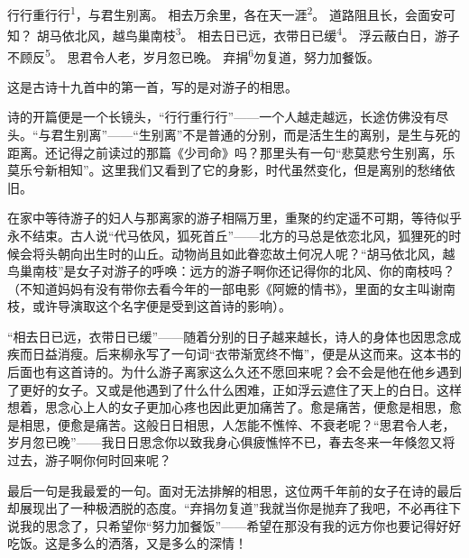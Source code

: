 
\begin{poem}
行行重行行\textsuperscript{1}，与君生别离。
相去万余里，各在天一涯\textsuperscript{2}。
道路阻且长，会面安可知？
胡马依北风，越鸟巢南枝\textsuperscript{3}。
相去日已远，衣带日已缓\textsuperscript{4}。
浮云蔽白日，游子不顾反\textsuperscript{5}。
思君令人老，岁月忽已晚。
弃捐\textsuperscript{6}勿复道，努力加餐饭。
\end{poem}

\begin{annotations}
\end{annotations}

\begin{appreciation}
这是古诗十九首中的第一首，写的是对游子的相思。

诗的开篇便是一个长镜头，“行行重行行”——一个人越走越远，长途仿佛没有尽头。“与君生别离”——“生别离”不是普通的分别，而是活生生的离别，是生与死的距离。还记得之前读过的那篇《少司命》吗？那里头有一句“悲莫悲兮生别离，乐莫乐兮新相知”。这里我们又看到了它的身影，时代虽然变化，但是离别的愁绪依旧。

在家中等待游子的妇人与那离家的游子相隔万里，重聚的约定遥不可期，等待似乎永不结束。古人说“代马依风，狐死首丘”——北方的马总是依恋北风，狐狸死的时候会将头朝向出生时的山丘。动物尚且如此眷恋故土何况人呢？“胡马依北风，越鸟巢南枝”是女子对游子的呼唤：远方的游子啊你还记得你的北风、你的南枝吗？（不知道妈妈有没有带你去看今年的一部电影《阿嬷的情书》，里面的女主叫谢南枝，或许导演取这个名字便是受到这首诗的影响）。

“相去日已远，衣带日已缓”——随着分别的日子越来越长，诗人的身体也因思念成疾而日益消瘦。后来柳永写了一句词“衣带渐宽终不悔”，便是从这而来。这本书的后面也有这首诗的。为什么游子离家这么久还不愿回来呢？会不会是他在他乡遇到了更好的女子。又或是他遇到了什么什么困难，正如浮云遮住了天上的白日。这样想着，思念心上人的女子更加心疼也因此更加痛苦了。愈是痛苦，便愈是相思，愈是相思，便愈是痛苦。这般日日相思，人怎能不憔悴、不衰老呢？“思君令人老，岁月忽已晚”——我日日思念你以致我身心俱疲憔悴不已，春去冬来一年倏忽又将过去，游子啊你何时回来呢？

最后一句是我最爱的一句。面对无法排解的相思，这位两千年前的女子在诗的最后却展现出了一种极洒脱的态度。“弃捐勿复道”我就当你是抛弃了我吧，不必再往下说我的思念了，只希望你“努力加餐饭”——希望在那没有我的远方你也要记得好好吃饭。这是多么的洒落，又是多么的深情！
\end{appreciation}
